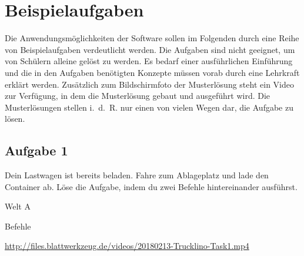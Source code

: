 \chapter{Beispielaufgaben}
\label{sec:exercises}

Die Anwendungsmöglichkeiten der Software sollen im Folgenden durch eine Reihe von Beispielaufgaben verdeutlicht werden. Die Aufgaben sind nicht geeignet, um von Schülern alleine gelöst zu werden. Es bedarf einer ausführlichen Einführung und die in den Aufgaben benötigten Konzepte müssen vorab durch eine Lehrkraft erklärt werden. Zusätzlich zum Bildschirmfoto der Musterlösung steht ein Video zur Verfügung, in dem die Musterlösung gebaut und ausgeführt wird. Die Musterlösungen stellen i.~d.~R. nur einen von vielen Wegen dar, die Aufgabe zu lösen.

\section*{Aufgabe 1}
\label{sec:exercises:1}

Dein Lastwagen ist bereits beladen. Fahre zum Ablageplatz und lade den Container ab. Löse die Aufgabe, indem du zwei Befehle hintereinander ausführst.

\begin{description}[noitemsep]
  \item[Welt wählen:] Welt A
  \item[Du brauchst:] Befehle
  \item[Video:] \url{http://files.blattwerkzeug.de/videos/20180213-Trucklino-Task1.mp4}
\end{description}

